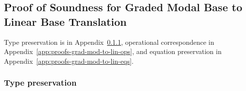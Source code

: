 \subsection{Proof of Soundness for Graded Modal Base to Linear Base Translation}
\label{app:proofs-grad-mod-to-lin}

\ifextended\gradModToLinTranslation*\fi

Type preservation is in Appendix~\ref{app:proofs-grad-mod-to-lin-typ},
operational correspondence in Appendix~\ref{app:proofs-grad-mod-to-lin-ops},
and equation preservation in Appendix~\ref{app:proofs-grad-mod-to-lin-eqs}.

\subsubsection{Type preservation}
\label{app:proofs-grad-mod-to-lin-typ}

